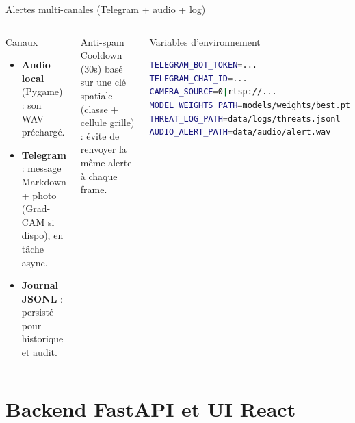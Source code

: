 \documentclass[aspectratio=169,11pt]{beamer}
\begin{document}
\begin{frame}{Alertes multi-canales (Telegram + audio + log)}
  \begin{columns}[T,onlytextwidth]
    \begin{block}{Canaux}
      \begin{itemize}
        \item \textbf{Audio local} (Pygame) : son WAV préchargé.
        \item \textbf{Telegram} : message Markdown + photo (Grad-CAM si dispo), en tâche async.
        \item \textbf{Journal JSONL} : persisté pour historique et audit.
      \end{itemize}
    \end{block}

    \begin{block}{Anti-spam}
      Cooldown (30s) basé sur une clé spatiale (classe + cellule grille) :\newline
      évite de renvoyer la même alerte à chaque frame.
    \end{block}

    \begin{block}{Variables d'environnement}
\begin{lstlisting}[language=bash]
TELEGRAM_BOT_TOKEN=...
TELEGRAM_CHAT_ID=...
CAMERA_SOURCE=0|rtsp://...
MODEL_WEIGHTS_PATH=models/weights/best.pt
THREAT_LOG_PATH=data/logs/threats.jsonl
AUDIO_ALERT_PATH=data/audio/alert.wav
\end{lstlisting}
    \end{block}
  \end{columns}
\end{frame}

\section{Backend FastAPI et UI React}
\end{document}
